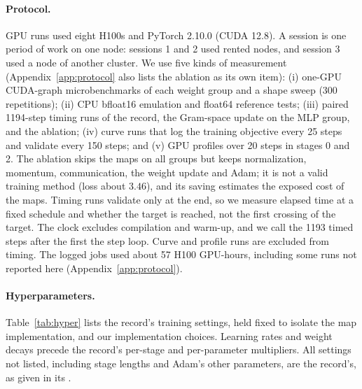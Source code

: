 \documentclass{article}
\begin{document}
\paragraph{Protocol.} GPU runs used eight H100s and PyTorch 2.10.0 (CUDA 12.8). A session is one period of work on one node: sessions 1 and 2 used rented nodes, and session 3 used a node of another cluster. We use five kinds of measurement (Appendix~\ref{app:protocol} also lists the ablation as its own item): (i) one-GPU CUDA-graph microbenchmarks of each weight group and a shape sweep (300 repetitions); (ii) CPU bfloat16 emulation and float64 reference tests; (iii) paired 1194-step timing runs of the record, the Gram-space update on the MLP group, and the ablation; (iv) curve runs that log the training objective every 25 steps and validate every 150 steps; and (v) GPU profiles over 20 steps in stages 0 and 2. The ablation skips the maps on all groups but keeps normalization, momentum, communication, the weight update and Adam; it is not a valid training method (loss about $3.46$), and its saving estimates the exposed cost of the maps. Timing runs validate only at the end, so we measure elapsed time at a fixed schedule and whether the target is reached, not the first crossing of the target. The clock excludes compilation and warm-up, and we call the 1193 timed steps after the first the step loop. Curve and profile runs are excluded from timing. The logged jobs used about 57 H100 GPU-hours, including some runs not reported here (Appendix~\ref{app:protocol}).

\paragraph{Hyperparameters.} Table~\ref{tab:hyper} lists the record's training settings, held fixed to isolate the map implementation, and our implementation choices. Learning rates and weight decays precede the record's per-stage and per-parameter multipliers. All settings not listed, including stage lengths and Adam's other parameters, are the record's, as given in its .
\end{document}
